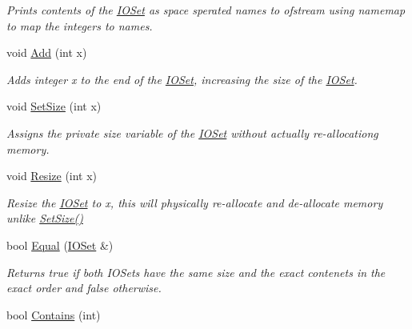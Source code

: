 \begin{DoxyCompactItemize}
\begin{DoxyCompactList}\small\item\em Prints contents of the \hyperlink{class_i_o_set}{IOSet} as space sperated names to ofstream using namemap to map the integers to names. \item\end{DoxyCompactList}\item 
\hypertarget{class_i_o_set_ae9b008481e0f283e6c6d4ed99b91dc0e}{
void \hyperlink{class_i_o_set_ae9b008481e0f283e6c6d4ed99b91dc0e}{Add} (int x)}
\label{class_i_o_set_ae9b008481e0f283e6c6d4ed99b91dc0e}

\begin{DoxyCompactList}\small\item\em Adds integer x to the end of the \hyperlink{class_i_o_set}{IOSet}, increasing the size of the \hyperlink{class_i_o_set}{IOSet}. \item\end{DoxyCompactList}\item 
void \hyperlink{class_i_o_set_a45a883dcdfae7eafbc303039727bdf49}{SetSize} (int x)
\begin{DoxyCompactList}\small\item\em Assigns the private size variable of the \hyperlink{class_i_o_set}{IOSet} without actually re-\/allocationg memory. \item\end{DoxyCompactList}\item 
\hypertarget{class_i_o_set_a31b2d68680061f676892b70954b55102}{
void \hyperlink{class_i_o_set_a31b2d68680061f676892b70954b55102}{Resize} (int x)}
\label{class_i_o_set_a31b2d68680061f676892b70954b55102}

\begin{DoxyCompactList}\small\item\em Resize the \hyperlink{class_i_o_set}{IOSet} to x, this will physically re-\/allocate and de-\/allocate memory unlike \hyperlink{class_i_o_set_a45a883dcdfae7eafbc303039727bdf49}{SetSize()} \item\end{DoxyCompactList}\item 
\hypertarget{class_i_o_set_adf73ea0bebbddbb1136d26fc9f6dddba}{
bool \hyperlink{class_i_o_set_adf73ea0bebbddbb1136d26fc9f6dddba}{Equal} (\hyperlink{class_i_o_set}{IOSet} \&)}
\label{class_i_o_set_adf73ea0bebbddbb1136d26fc9f6dddba}

\begin{DoxyCompactList}\small\item\em Returns true if both IOSets have the same size and the exact contenets in the exact order and false otherwise. \item\end{DoxyCompactList}\item 
\hypertarget{class_i_o_set_a928b470720d1ce878a73a06f39647de9}{
bool \hyperlink{class_i_o_set_a928b470720d1ce878a73a06f39647de9}{Contains} (int)}
\label{class_i_o_set_a928b470720d1ce878a73a06f39647de9}


\end{DoxyCompactItemize}
